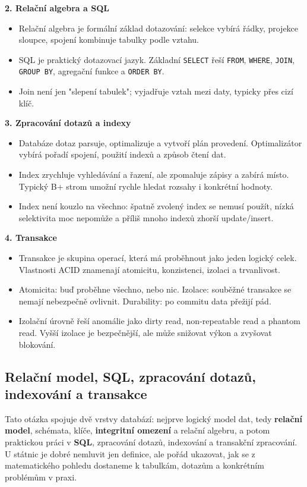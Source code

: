 \documentclass[11pt,a4paper]{article}
\begin{document}
\textbf{2. Relační algebra a SQL}
\begin{itemize}
  \item Relační algebra je formální základ dotazování: selekce vybírá řádky, projekce sloupce, spojení kombinuje tabulky podle vztahu.
  \item SQL je praktický dotazovací jazyk. Základní \texttt{SELECT} řeší \texttt{FROM}, \texttt{WHERE}, \texttt{JOIN}, \texttt{GROUP BY}, agregační funkce a \texttt{ORDER BY}.
  \item Join není jen "slepení tabulek"; vyjadřuje vztah mezi daty, typicky přes cizí klíč.
\end{itemize}

\textbf{3. Zpracování dotazů a indexy}
\begin{itemize}
  \item Databáze dotaz parsuje, optimalizuje a vytvoří plán provedení. Optimalizátor vybírá pořadí spojení, použití indexů a způsob čtení dat.
  \item Index zrychluje vyhledávání a řazení, ale zpomaluje zápisy a zabírá místo. Typický B+ strom umožní rychle hledat rozsahy i konkrétní hodnoty.
  \item Index není kouzlo na všechno: špatně zvolený index se nemusí použít, nízká selektivita moc nepomůže a příliš mnoho indexů zhorší update/insert.
\end{itemize}

\textbf{4. Transakce}
\begin{itemize}
  \item Transakce je skupina operací, která má proběhnout jako jeden logický celek. Vlastnosti ACID znamenají atomicitu, konzistenci, izolaci a trvanlivost.
  \item Atomicita: buď proběhne všechno, nebo nic. Izolace: souběžné transakce se nemají nebezpečně ovlivnit. Durability: po commitu data přežijí pád.
  \item Izolační úrovně řeší anomálie jako dirty read, non-repeatable read a phantom read. Vyšší izolace je bezpečnější, ale může snižovat výkon a zvyšovat blokování.
\end{itemize}

\subsection*{Relační model, SQL, zpracování dotazů, indexování a transakce}

Tato otázka spojuje dvě vrstvy databází: nejprve logický model dat, tedy \textbf{relační model}, schémata, klíče, \textbf{integritní omezení} a relační algebru, a potom praktickou práci v \textbf{SQL}, zpracování dotazů, indexování a transakční zpracování. U státnic je dobré nemluvit jen definice, ale pořád ukazovat, jak se z matematického pohledu dostaneme k tabulkám, dotazům a konkrétním problémům v praxi.
\end{document}
